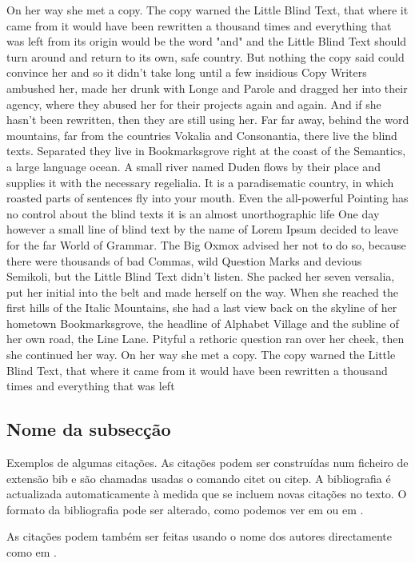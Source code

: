\documentclass[11pt,a4paper,twoside,openright]{book}
\begin{document}
\begin{sloppy}
On her way she met a copy. The copy warned the Little Blind Text, that where it came from it would have been rewritten a thousand times and everything that was left from its origin would be the word "and" and the Little Blind Text should turn around and return to its own, safe country. But nothing the copy said could convince her and so it didn’t take long until a few insidious Copy Writers ambushed her, made her drunk with Longe and Parole and dragged her into their agency, where they abused her for their projects again and again. And if she hasn’t been rewritten, then they are still using her. Far far away, behind the word mountains, far from the countries Vokalia and Consonantia, there live the blind texts. Separated they live in Bookmarksgrove right at the coast of the Semantics, a large language ocean. A small river named Duden flows by their place and supplies it with the necessary regelialia. It is a paradisematic country, in which roasted parts of sentences fly into your mouth. Even the all-powerful Pointing has no control about the blind texts it is an almost unorthographic life One day however a small line of blind text by the name of Lorem Ipsum decided to leave for the far World of Grammar. The Big Oxmox advised her not to do so, because there were thousands of bad Commas, wild Question Marks and devious Semikoli, but the Little Blind Text didn’t listen. She packed her seven versalia, put her initial into the belt and made herself on the way. When she reached the first hills of the Italic Mountains, she had a last view back on the skyline of her hometown Bookmarksgrove, the headline of Alphabet Village and the subline of her own road, the Line Lane. Pityful a rethoric question ran over her cheek, then she continued her way. On her way she met a copy. The copy warned the Little Blind Text, that where it came from it would have been rewritten a thousand times and everything that was left 

\subsection{Nome da subsecção}

Exemplos de algumas citações. As citações podem ser construídas num ficheiro de extensão bib e são chamadas usadas o comando citet ou citep. A bibliografia é actualizada automaticamente à medida que se incluem novas citações no texto. O formato da bibliografia pode ser alterado, como podemos ver em \citep{latexcompanion} ou em \citep{knuthwebsite}. 

As citações podem também ser feitas usando o nome dos autores directamente como em \citet{einstein}.


\end{sloppy}
\end{document}
